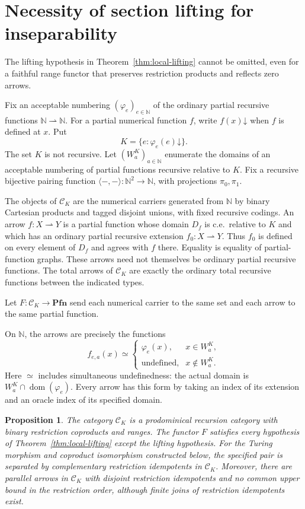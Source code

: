 \documentclass[11pt]{article}
\newtheorem{proposition}[theorem]{Proposition}
\newcommand{\N}{\mathbb N}
\newcommand{\Pfn}{\mathbf{Pfn}}
\begin{document}
\section{Necessity of section lifting for inseparability}
\label{app:lifting-counterexample}

The lifting hypothesis in Theorem~\ref{thm:local-lifting} cannot be
omitted, even for a faithful range functor that preserves restriction
products and reflects zero arrows.

Fix an acceptable numbering $(\varphi_e)_{e\in\N}$ of the ordinary
partial recursive functions $\N\rightharpoonup\N$. For a partial
numerical function $f$, write $f(x)\mathord\downarrow$ when $f$ is
defined at $x$. Put
\[
 K=\{e:\varphi_e(e)\mathord\downarrow\}.
\]
The set $K$ is not recursive.
Let $(W_a^K)_{a\in\N}$ enumerate the domains of an acceptable
numbering of partial functions recursive relative to $K$.
Fix a recursive bijective pairing function
$\langle-,-\rangle:\N^2\to\N$, with projections $\pi_0,\pi_1$.

The objects of $\mathcal C_K$ are the numerical carriers generated
from $\N$ by binary Cartesian products and tagged disjoint unions,
with fixed recursive codings. An arrow $f:X\rightharpoonup Y$ is a partial function whose
domain $D_f$ is c.e.\ relative to $K$ and which has an ordinary partial
recursive extension $f_0:X\rightharpoonup Y$. Thus $f_0$ is defined
on every element of $D_f$ and agrees with $f$ there. Equality is equality
of partial-function graphs. These arrows need not themselves be ordinary
partial recursive functions. The total arrows of $\mathcal C_K$ are exactly
the ordinary total recursive functions between the indicated types.

Let $F:\mathcal C_K\to\Pfn$ send each numerical carrier to the same
set and each arrow to the same partial function.

On $\N$, the arrows are precisely the functions
\[
 f_{e,a}(x)\simeq
 \begin{cases}
  \varphi_e(x),&x\in W_a^K,\\
  \text{undefined},&x\notin W_a^K.
 \end{cases}
\]
Here $\simeq$ includes simultaneous undefinedness: the actual domain
is $W_a^K\cap\operatorname{dom}(\varphi_e)$. Every arrow has this
form by taking an index of its extension and an oracle index of its
specified domain.

\begin{proposition}\label{prop:missing-lift}
The category $\mathcal C_K$ is a prodominical recursion category with
binary restriction coproducts and ranges. The functor $F$ satisfies
every hypothesis of
Theorem~\ref{thm:local-lifting} except the lifting hypothesis.
For the Turing morphism and coproduct isomorphism constructed below,
the specified pair is separated by complementary restriction idempotents in
$\mathcal C_K$. Moreover, there are parallel arrows in $\mathcal C_K$
with disjoint restriction idempotents and no common upper bound in
the restriction order, although finite joins of restriction idempotents
exist.
\end{proposition}
\end{document}
